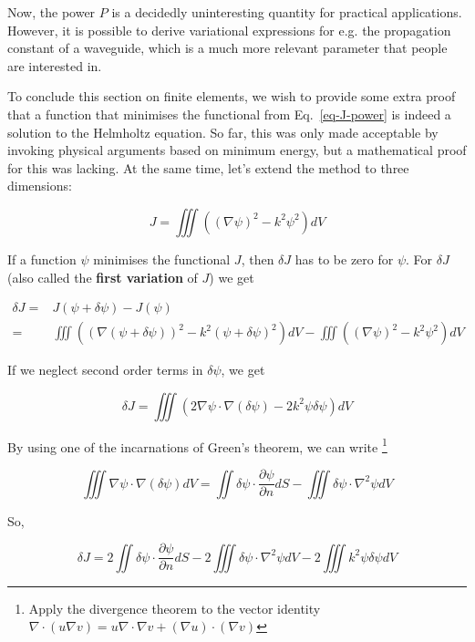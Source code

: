 Now, the power $P$ is a decidedly uninteresting quantity for practical applications. However, it is possible to derive variational expressions for e.g. the propagation constant of a waveguide, which is a much more relevant parameter that people are interested in.

To conclude this section on finite elements, we wish to provide some extra proof that a function that minimises the functional from Eq.~\ref{eq-J-power} is indeed a solution to the Helmholtz equation. So far, this was only made acceptable by invoking physical arguments based on minimum energy, but a mathematical proof for this was lacking. At the same time, let's extend the method to three dimensions:

\begin{equation}
J = \iiint \left((\nabla \psi)^2 - k^2 \psi^2 \right) dV \label{eq-variational1}
\end{equation} 

If a function $\psi$ minimises the functional $J$, then $\delta J$ has to be zero for $\psi$. For $\delta J$ (also called the \textbf{first variation} of $J$) we get

\begin{align}
\delta J =& J(\psi + \delta \psi) - J(\psi) \\
         =& \iiint \left( (\nabla (\psi + \delta \psi))^2 - k^2 (\psi + \delta \psi)^2 \right) dV - \iiint \left((\nabla \psi)^2 - k^2 \psi^2 \right) dV
\end{align} 

If we neglect second order terms in $\delta \psi$, we get

\begin{equation}
\delta J = \iiint \left( 2 \nabla \psi \cdot \nabla (\delta \psi) - 2 k^2 \psi \delta \psi \right) dV
\end{equation}

By using one of the incarnations of Green's theorem, we can write \footnote{Apply the divergence theorem to the vector identity $\nabla \cdot (u \nabla v) = u \nabla \cdot \nabla v + (\nabla u) \cdot (\nabla v)$}

\begin{equation}
\iiint \nabla \psi \cdot \nabla (\delta \psi) dV = \iint \delta \psi \cdot \frac{\partial \psi}{\partial n} dS - \iiint \delta \psi \cdot \nabla^2 \psi dV
\end{equation} 

So,

\begin{equation}
\delta J = 2\iint \delta \psi \cdot \frac{\partial \psi}{\partial n} dS - 2\iiint \delta \psi \cdot \nabla^2 \psi dV - 2 \iiint k^2 \psi \delta \psi dV
\end{equation} 

